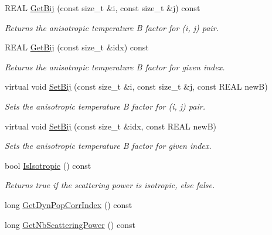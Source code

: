 \begin{DoxyCompactItemize}
R\+E\+AL \mbox{\hyperlink{class_obj_cryst_1_1_scattering_power_a659eaed09da7c108c2f1182b8d1ce0e8}{Get\+Bij}} (const size\+\_\+t \&i, const size\+\_\+t \&j) const
\begin{DoxyCompactList}\small\item\em Returns the anisotropic temperature B factor for (i, j) pair. \end{DoxyCompactList}\item 
R\+E\+AL \mbox{\hyperlink{class_obj_cryst_1_1_scattering_power_a781089695f7e8595313b5a0acfba65c1}{Get\+Bij}} (const size\+\_\+t \&idx) const
\begin{DoxyCompactList}\small\item\em Returns the anisotropic temperature B factor for given index. \end{DoxyCompactList}\item 
virtual void \mbox{\hyperlink{class_obj_cryst_1_1_scattering_power_aee5ad2e8325feea42430bd1ed54eabfc}{Set\+Bij}} (const size\+\_\+t \&i, const size\+\_\+t \&j, const R\+E\+AL newB)
\begin{DoxyCompactList}\small\item\em Sets the anisotropic temperature B factor for (i, j) pair. \end{DoxyCompactList}\item 
virtual void \mbox{\hyperlink{class_obj_cryst_1_1_scattering_power_a7f5d987bea1be793bf8e9d6951357c3e}{Set\+Bij}} (const size\+\_\+t \&idx, const R\+E\+AL newB)
\begin{DoxyCompactList}\small\item\em Sets the anisotropic temperature B factor for given index. \end{DoxyCompactList}\item 
bool \mbox{\hyperlink{class_obj_cryst_1_1_scattering_power_a377a16510c3fac75c84bb8b100cc3a2d}{Is\+Isotropic}} () const
\begin{DoxyCompactList}\small\item\em Returns true if the scattering power is isotropic, else false. \end{DoxyCompactList}\item 
long \mbox{\hyperlink{class_obj_cryst_1_1_scattering_power_a7cdd8e3a157936fe5bf2af136e7b1f2e}{Get\+Dyn\+Pop\+Corr\+Index}} () const
\item 
\mbox{\label{class_obj_cryst_1_1_scattering_power_a6570ede3ba1728d3b0513cbc6a68acb8}} 
long \mbox{\hyperlink{class_obj_cryst_1_1_scattering_power_a6570ede3ba1728d3b0513cbc6a68acb8}{Get\+Nb\+Scattering\+Power}} () const

\end{DoxyCompactItemize}
